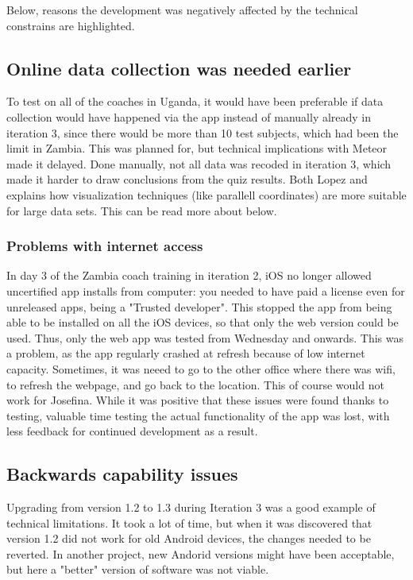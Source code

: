 Below, reasons the development was negatively affected by the technical constrains are highlighted.

\subsection{Online data collection was needed earlier}
To test on all of the coaches in Uganda, it would have been preferable if data collection would have happened via the app instead of manually already in iteration 3, since there would be more than 10 test subjects, which had been the limit in Zambia. This was planned for, but technical implications with Meteor made it delayed. Done manually, not all data was recoded in iteration 3, which made it harder to draw conclusions from the quiz results. Both Lopez \cite{une-terre} and \cite{ropinski} explains how visualization techniques (like parallell coordinates) are more suitable for large data sets. This can be read more about below.

\subsubsection{Problems with internet access}
In day 3 of the Zambia coach training in iteration 2, iOS no longer allowed uncertified app installs from computer: you needed to have paid a license even for unreleased apps, being a "Trusted developer". This stopped the app from being able to be installed on all the iOS devices, so that only the web version could be used. Thus, only the web app was tested from Wednesday and onwards. This was a problem, as the app regularly crashed at refresh because of low internet capacity. Sometimes, it was neeed to go to the other office where there was wifi, to refresh the webpage, and go back to the location. This of course would not work for Josefina. While it was positive that these issues were found thanks to testing, valuable time testing the actual functionality of the app was lost, with less feedback for continued development as a result.

\subsection{Backwards capability issues} \label{backwards-capability}
Upgrading from version 1.2 to 1.3 during Iteration 3 was a good example of technical limitations. It took a lot of time, but when it was discovered that version 1.2 did not work for old Android devices, the changes needed to be reverted. In another project, new Andorid versions might have been acceptable, but here a "better" version of software was not viable.

